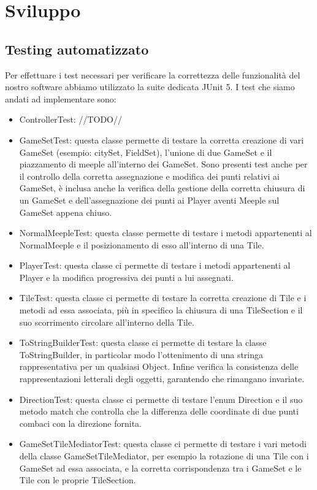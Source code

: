 \section{Sviluppo}
\subsection{Testing automatizzato}
Per effettuare i test necessari per verificare la correttezza delle funzionalità del nostro software abbiamo utilizzato la suite dedicata JUnit 5. I test che siamo andati ad implementare sono:
\begin{itemize}
    \item ControllerTest: //TODO//
    \item GameSetTest: questa classe permette di testare la corretta creazione di vari GameSet (esempio: citySet, FieldSet), l'unione di due GameSet e il piazzamento di meeple all'interno dei GameSet. Sono presenti test anche per il controllo della corretta assegnazione e modifica dei punti relativi ai GameSet, è inclusa anche la verifica della gestione della corretta chiusura di un GameSet e dell'assegnazione dei punti ai Player aventi Meeple sul GameSet appena chiuso.
    \item NormalMeepleTest: questa classe permette di testare i metodi appartenenti al NormalMeeple e il posizionamento di esso all'interno di una Tile.
    \item PlayerTest: questa classe ci permette di testare i metodi appartenenti al Player e la modifica progressiva dei punti a lui assegnati.
    \item TileTest: questa classe ci permette di testare la corretta creazione di Tile e i metodi ad essa associata, più in specifico la chiusura di una TileSection e il suo scorrimento circolare all'interno della Tile.
    \item ToStringBuilderTest: questa classe ci permette di testare la classe ToStringBuilder, in particolar modo l'ottenimento di una stringa rappresentativa per un qualsiasi Object. Infine verifica la consistenza delle rappresentazioni letterali degli oggetti, garantendo che rimangano invariate.
    \item DirectionTest: questa classe ci permette di testare l'enum Direction e il suo metodo match che controlla che la differenza delle coordinate di due punti combaci con la direzione fornita.
    \item GameSetTileMediatorTest: questa classe ci permette di testare i vari metodi della classe GameSetTileMediator, per esempio la rotazione di una Tile con i GameSet ad essa associata, e la corretta corrispondenza tra i GameSet e le Tile con le proprie TileSection.
\end{itemize}

